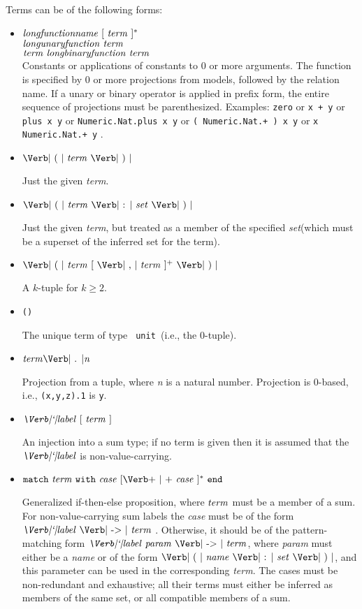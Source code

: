 \documentclass[12pt]{article}
\newcommand{\keywd}[1]{\mbox{\texttt{#1}}\xspace}
\newcommand{\END}{\keywd{end}}
\newcommand{\MATCH}{\keywd{match}}
\newcommand{\UNIT}{\mbox{\Verb| unit |}}
\newcommand{\WITH}{\keywd{with}}
\newcommand{\metav}[1]{\mbox{\textit{#1}}\xspace}
\newcommand{\Case}{\metav{case}}
\newcommand{\Ident}{\metav{name}}
\newcommand{\Identifier}{\Ident}
\newcommand{\Label}{\metav{\Verb|`|label}}
\newcommand{\Setexp}{\metav{set}}
\newcommand{\Param}{\metav{param}}
\newcommand{\Term}{\metav{term}}
\newcommand{\ARROW}{\mbox{\Verb| -> |}}
\newcommand{\BAR}{\mbox{\Verb+ | +}}
\newcommand{\COLON}{\mbox{\Verb| : |}}
\newcommand{\COMMA}{\mbox{\Verb| , |}}
\newcommand{\LPAREN}{\mbox{\Verb| ( |}}
\newcommand{\RPAREN}{\mbox{\Verb| ) |}}
\newcommand{\PERIOD}{\mbox{\Verb| . |}}
\begin{document}
Terms can be of the following forms:
\begin{itemize}
\item $\metav{longfunctionname}\ [\ \Term\ ]^*$\\
      $\metav{longunaryfunction}\ \Term$\\
      $\Term\ \metav{longbinaryfunction}\ \Term$\\
  
  Constants or applications of constants to 0 or more arguments.  The
  function is specified by 0 or more projections from models, followed
  by the relation name.  If a unary or binary operator is applied in
  prefix form, the entire sequence of projections must be
  parenthesized.  Examples: \Verb|zero| or \Verb|x + y| or 
 \Verb|plus x y| or \Verb|Numeric.Nat.plus x y| or \Verb|( Numeric.Nat.+ ) x y|
  or \Verb|x Numeric.Nat.+ y| .

\item $\LPAREN\ \Term\ \RPAREN$

  Just the given \Term.

\item $\LPAREN\ \Term\ \COLON\ \Setexp\ \RPAREN$

  Just the given \Term, but treated as a member of the specified
  \Setexp (which must be a superset of the inferred set for the term).

\item $\LPAREN\ \Term\ [\ \COMMA\ \Term\ ]^{+}\ \RPAREN$

  A $k$-tuple for $k\ge 2$.

\item \Verb|()|

  The unique term of type \UNIT (i.e., the 0-tuple).

\item $\Term \PERIOD \metav{n}$
 
  Projection from a tuple, where \metav{n} is a natural number.  Projection
  is 0-based, i.e., \Verb|(x,y,z).1| is \Verb|y|.

\item $\Label\ [\ \Term\ ]$

  An injection into a sum type; if no term is given then it is
  assumed that the $\Label$ is non-value-carrying.

\item $\MATCH\ \Term\ \WITH\ \Case\ [\BAR\ \Case\ ]^*\ \END$
  
  Generalized if-then-else proposition, where
  $\Term$ must be a member of a sum.  For non-value-carrying
  sum labels the \Case must be of the form  $\Label\ \ARROW\
  \Term$ .  Otherwise, it should be of the pattern-matching
  form $\Label\ \Param\ \ARROW\ \Term$, where \Param must
  either be a \Ident or of the form $\LPAREN\ \Identifier\ \COLON\ 
  \Setexp\ \RPAREN$, and this parameter can be used in the
  corresponding \Term.  The cases must be non-redundant
  and exhaustive; all their terms must either be inferred
  as members of the same set, or all compatible members
  of a sum.
  

\end{itemize}
\end{document}
